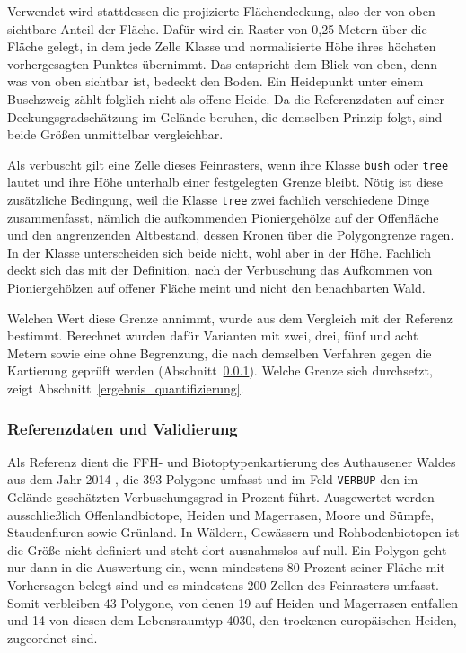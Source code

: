 Verwendet wird stattdessen die projizierte Flächendeckung, also der von oben sichtbare Anteil der Fläche. Dafür wird ein Raster von 0,25 Metern über die Fläche gelegt, in dem jede Zelle Klasse und normalisierte Höhe ihres höchsten vorhergesagten Punktes übernimmt. Das entspricht dem Blick von oben, denn was von oben sichtbar ist, bedeckt den Boden. Ein Heidepunkt unter einem Buschzweig zählt folglich nicht als offene Heide. Da die Referenzdaten auf einer Deckungsgradschätzung im Gelände beruhen, die demselben Prinzip folgt, sind beide Größen unmittelbar vergleichbar.

Als verbuscht gilt eine Zelle dieses Feinrasters, wenn ihre Klasse \texttt{bush} oder \texttt{tree} lautet und ihre Höhe unterhalb einer festgelegten Grenze bleibt. Nötig ist diese zusätzliche Bedingung, weil die Klasse \texttt{tree} zwei fachlich verschiedene Dinge zusammenfasst, nämlich die aufkommenden Pioniergehölze auf der Offenfläche und den angrenzenden Altbestand, dessen Kronen über die Polygongrenze ragen. In der Klasse unterscheiden sich beide nicht, wohl aber in der Höhe. Fachlich deckt sich das mit der Definition, nach der Verbuschung das Aufkommen von Pioniergehölzen auf offener Fläche meint und nicht den benachbarten Wald.

Welchen Wert diese Grenze annimmt, wurde aus dem Vergleich mit der Referenz bestimmt. Berechnet wurden dafür Varianten mit zwei, drei, fünf und acht Metern sowie eine ohne Begrenzung, die nach demselben Verfahren gegen die Kartierung geprüft werden (Abschnitt~\ref{validierung}). Welche Grenze sich durchsetzt, zeigt Abschnitt~\ref{ergebnis_quantifizierung}.

\subsubsection{Referenzdaten und Validierung}\label{validierung}

Als Referenz dient die FFH- und Biotoptypenkartierung des Authausener Waldes aus dem Jahr 2014 \cite{DBU.Biotopkartierung2014}, die 393 Polygone umfasst und im Feld \texttt{VERBUP} den im Gelände geschätzten Verbuschungsgrad in Prozent führt. Ausgewertet werden ausschließlich Offenlandbiotope, Heiden und Magerrasen, Moore und Sümpfe, Staudenfluren sowie Grünland. In Wäldern, Gewässern und Rohbodenbiotopen ist die Größe nicht definiert und steht dort ausnahmslos auf null. Ein Polygon geht nur dann in die Auswertung ein, wenn mindestens 80 Prozent seiner Fläche mit Vorhersagen belegt sind und es mindestens 200 Zellen des Feinrasters umfasst. Somit verbleiben 43 Polygone, von denen 19 auf Heiden und Magerrasen entfallen und 14 von diesen dem Lebensraumtyp 4030, den trockenen europäischen Heiden, zugeordnet sind.

